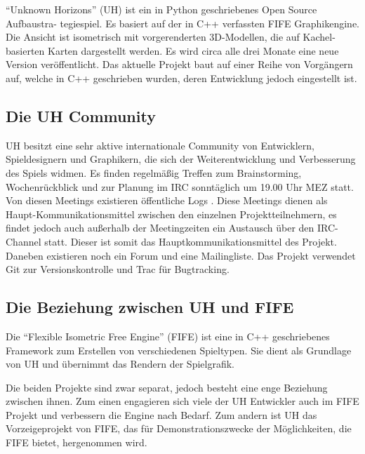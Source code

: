 \enquote{Unknown Horizons} (UH) ist ein in Python geschriebenes Open Source Aufbaustra-
tegiespiel. Es basiert auf der in C++
verfassten FIFE Graphikengine. Die Ansicht ist isometrisch mit vorgerenderten 3D-Modellen,
die auf Kachel-basierten Karten dargestellt werden. Es wird circa alle drei Monate eine neue Version
veröffentlicht. Das aktuelle Projekt baut auf einer Reihe von Vorgängern auf, welche
in C++ geschrieben wurden, deren Entwicklung jedoch eingestellt ist.

\subsection{Die UH Community}
UH besitzt eine sehr aktive internationale Community von Entwicklern, Spieldesignern und Graphikern, die
sich der Weiterentwicklung und Verbesserung des Spiels widmen.
Es finden regelmäßig Treffen zum Brainstorming, Wochenrückblick
und zur Planung im IRC sonntäglich um 19.00 Uhr MEZ statt. Von diesen Meetings existieren
öffentliche Logs \cite{uhlogs}.
Diese Meetings dienen als Haupt-Kommunikationsmittel zwischen den einzelnen Projektteilnehmern,
es findet jedoch auch außerhalb der Meetingzeiten ein Austausch über den  IRC-Channel statt.
Dieser ist somit das
Hauptkommunikationsmittel des Projekt. Daneben existieren noch ein Forum
und eine Mailingliste. Das Projekt verwendet Git zur Versionskontrolle und Trac für
Bugtracking.

\subsection{Die Beziehung zwischen UH und FIFE}
Die \enquote{Flexible Isometric Free Engine} (FIFE) \cite{fife} ist eine in C++ geschriebenes Framework
zum Erstellen von verschiedenen Spieltypen. Sie dient als Grundlage von UH und übernimmt das Rendern
der Spielgrafik.

Die beiden Projekte sind zwar separat, jedoch besteht eine enge Beziehung zwischen ihnen. Zum einen
engagieren sich viele der UH Entwickler auch im FIFE Projekt und verbessern die Engine nach Bedarf.
Zum andern ist UH das Vorzeigeprojekt von FIFE, das für Demonstrationszwecke der
Möglichkeiten, die FIFE bietet, hergenommen wird.

